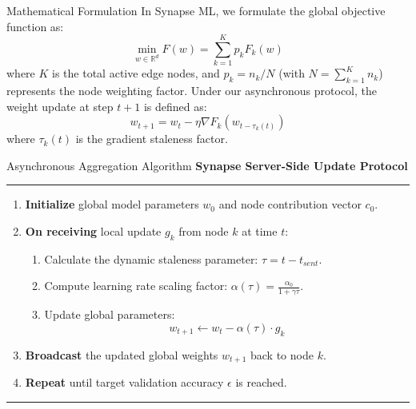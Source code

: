 \begin{frame}{Mathematical Formulation}
  In Synapse ML, we formulate the global objective function as:
  \begin{equation}
    \min_{w \in \mathbb{R}^d} F(w) = \sum_{k=1}^K p_k F_k(w)
  \end{equation}
  where $K$ is the total active edge nodes, and $p_k = n_k / N$ (with $N = \sum_{k=1}^K n_k$) represents the node weighting factor.
  Under our asynchronous protocol, the weight update at step $t+1$ is defined as:
  \begin{equation}
    w_{t+1} = w_t - \eta \nabla F_k(w_{t - \tau_k(t)})
  \end{equation}
  where $\tau_k(t)$ is the gradient staleness factor.
\end{frame}

\begin{frame}{Asynchronous Aggregation Algorithm}
  \textbf{Synapse Server-Side Update Protocol}
  \hrule\vspace{0.2cm}
  \begin{enumerate}
    \item \textbf{Initialize} global model parameters $w_0$ and node contribution vector $c_0$.
    \item \textbf{On receiving} local update $g_k$ from node $k$ at time $t$:
    \begin{enumerate}
      \item Calculate the dynamic staleness parameter: $\tau = t - t_{sent}$.
      \item Compute learning rate scaling factor: $\alpha(\tau) = \frac{\alpha_0}{1 + \gamma \tau}$.
      \item Update global parameters:
      \begin{equation*}
        w_{t+1} \leftarrow w_t - \alpha(\tau) \cdot g_k
      \end{equation*}
    \end{enumerate}
    \item \textbf{Broadcast} the updated global weights $w_{t+1}$ back to node $k$.
    \item \textbf{Repeat} until target validation accuracy $\epsilon$ is reached.
  \end{enumerate}
  \hrule
\end{frame}
